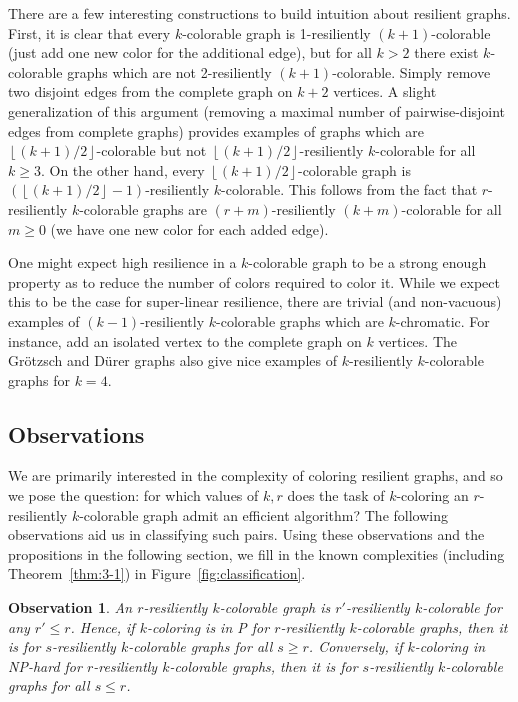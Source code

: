 \documentclass{article}[11pt]  %
\newtheorem{obs}{Observation}
\begin{document}
There are a few interesting constructions to build intuition about resilient
graphs. First, it is clear that every $k$-colorable graph is 1-resiliently
$(k+1)$-colorable (just add one new color for the additional edge), but for all
$k > 2$ there exist $k$-colorable graphs which are not 2-resiliently
$(k+1)$-colorable. Simply remove two disjoint edges from the complete graph on
$k+2$ vertices. A slight generalization of this argument (removing a maximal
number of pairwise-disjoint edges from complete graphs) provides examples of
graphs which are $\left \lfloor (k+1)/2\right \rfloor$-colorable but not $\left
\lfloor (k+1)/2 \right \rfloor$-resiliently $k$-colorable for all $k \geq 3$.
On the other hand, every $\left \lfloor (k+1)/2\right \rfloor$-colorable graph
is $(\left \lfloor (k+1)/2 \right \rfloor-1)$-resiliently $k$-colorable. This
follows from the fact that $r$-resiliently $k$-colorable graphs are
$(r+m)$-resiliently $(k+m)$-colorable for all $m \geq 0$ (we have one new color
for each added edge). 

One might expect high resilience in a $k$-colorable graph to be a strong enough
property as to reduce the number of colors required to color it. While we
expect this to be the case for super-linear resilience, there are trivial
(and non-vacuous) examples of $(k-1)$-resiliently $k$-colorable graphs which are
$k$-chromatic. For instance, add an isolated vertex to the complete graph on
$k$ vertices. The Gr{\"o}tzsch and D{\"u}rer graphs also give nice examples
of $k$-resiliently $k$-colorable graphs for $k=4$. 

\subsection{Observations}

We are primarily interested in the complexity of coloring resilient graphs, and
so we pose the question: for which values of $k,r$ does the task of
$k$-coloring an $r$-resiliently $k$-colorable graph admit an efficient
algorithm? The following observations aid us in classifying such pairs. Using
these observations and the propositions in the following section, we fill in
the known complexities (including Theorem~\ref{thm:3-1}) in
Figure~\ref{fig:classification}.

\begin{obs}\label{obs:horizontal}
An $r$-resiliently $k$-colorable graph is $r'$-resiliently $k$-colorable for
any $r' \leq r$. Hence, if $k$-coloring is in P for $r$-resiliently
$k$-colorable graphs, then it is for $s$-resiliently $k$-colorable graphs for
all $s \geq r$.  Conversely, if $k$-coloring in NP-hard for $r$-resiliently
$k$-colorable graphs, then it is for $s$-resiliently $k$-colorable graphs for
all $s \leq r$. 
\end{obs}
\end{document}
